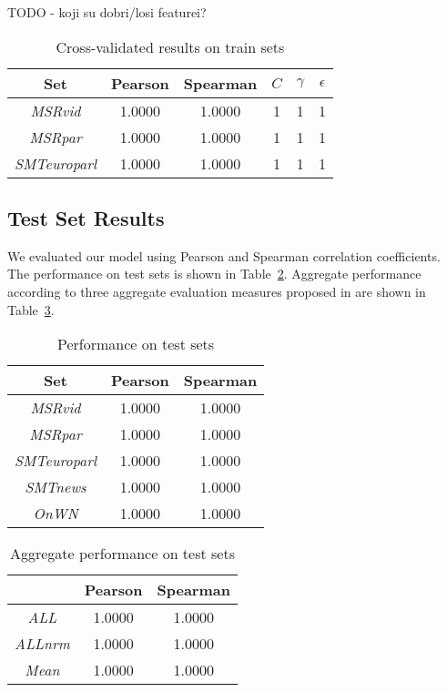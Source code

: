 \documentclass[10pt, a4paper]{article}
\begin{document}
TODO - koji su dobri/losi featurei?

\begin{table}[h]
\caption{Cross-validated results on train sets}
\label{tab:train-results-table}
\begin{center}
\begin{tabular}{cccccc}
\toprule
Set & Pearson & Spearman & $C$ & $\gamma$ & $\epsilon$ \\
\midrule
\textit{MSRvid} & 1.0000 & 1.0000 & 1 & 1 & 1 \\
\textit{MSRpar} & 1.0000 & 1.0000 & 1 & 1 & 1 \\
\textit{SMTeuroparl} & 1.0000 & 1.0000 & 1 & 1 & 1 \\
\bottomrule
\end{tabular}
\end{center}
\end{table}

\subsection{Test Set Results}

We evaluated our model using Pearson and Spearman correlation coefficients. The performance on test sets is shown in Table~\ref{tab:test-results-table}. Aggregate performance according to three aggregate evaluation measures proposed in \citep{agirre2012semeval} are shown in Table~\ref{tab:all-results-table}.

\begin{table}[h]
\caption{Performance on test sets}
\label{tab:test-results-table}
\begin{center}
\begin{tabular}{ccc}
\toprule
Set & Pearson & Spearman \\
\midrule
\textit{MSRvid} & 1.0000 & 1.0000 \\
\textit{MSRpar} & 1.0000 & 1.0000 \\
\textit{SMTeuroparl} & 1.0000 & 1.0000 \\
\textit{SMTnews} & 1.0000 & 1.0000 \\
\textit{OnWN} & 1.0000 & 1.0000 \\
\bottomrule
\end{tabular}
\end{center}
\end{table}

\begin{table}[h]
\caption{Aggregate performance on test sets}
\label{tab:all-results-table}
\begin{center}
\begin{tabular}{ccc}
\toprule
& Pearson & Spearman \\
\midrule
\textit{ALL} & 1.0000 & 1.0000 \\
\textit{ALLnrm} & 1.0000 & 1.0000 \\
\textit{Mean} & 1.0000 & 1.0000 \\
\bottomrule
\end{tabular}
\end{center}
\end{table}
\end{document}
